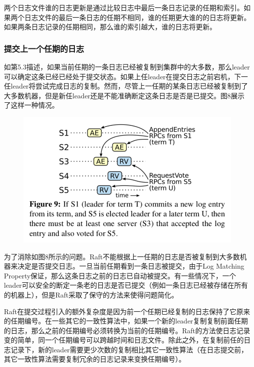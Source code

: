 \documentclass[journal]{IEEEtran}
\begin{document}
两个日志文件谁的日志更新是通过比较日志中最后一条日志记录的任期和索引。如果两个日志文件的最后一条日志的任期不相同，谁的任期更大谁的的日志将更新。如果两条日志记录的任期相同，那么谁的索引越大，谁的日志将更新。

\subsubsection{提交上一个任期的日志}

如第5.3描述，如果当前任期的一条日志已经被复制到集群中的大多数，那么leader可以确定这条已经已经处于提交状态。如果上任leader在提交日志之前宕机，下一任leader将尝试完成日志的复制。然而，尽管上一任期的某条日志已经被复制到了大多数机器，但是新任leader还是不能准确断定这条日志是否是已提交。图8展示了这样一种情况。
\begin{figure}[htbp]
\begin{center}
\includegraphics[width=1\linewidth]{./fig9.png}
\end{center}
\end{figure}

为了消除如图8所示的问题。Raft不能根据上一任期的日志是否被复制到大多数机器来决定是否提交日志。一旦当前任期看到一条日志被提交，由于Log Matching Property保证，那么这条日志之前的日志已自动被提交。有一些情况下，一个leader可以安全的断定一条老的日志是否已提交（例如一条日志已经被存储在所有的机器上），但是Raft采取了保守的方法来使得问题简化。

Raft在提交过程引入的额外复杂度是因为前一个任期已经复制的日志保持了它原来的任期编号。在一些其它的一致性算法中，如果一个新的leader复制复制前面任期的日志，那么之前的任期编号必须转换为当前的任期编号。Raft的方法使日志记录变的简单，同一个任期编号可以跨越时间和日志文件。除此之外，在复制前任的日志记录下，新的leader需要更少次数的复制相比其它一致性算法（在日志提交前，其它一致性算法需要复制冗余的日志记录来变换任期编号）。
\end{document}
